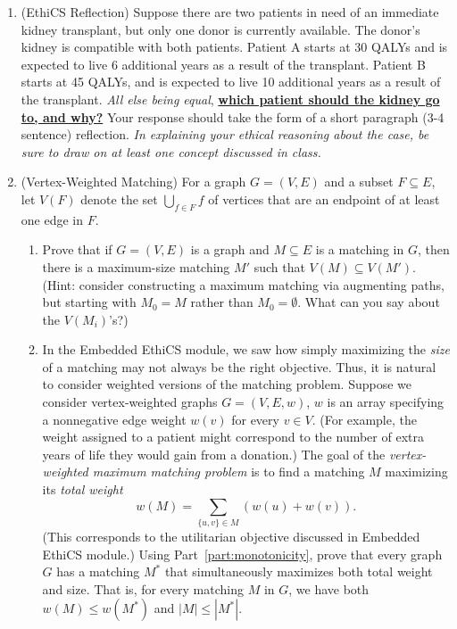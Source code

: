 \documentclass[11pt]{article}
\begin{document}
\begin{enumerate}
\begin{enumerate}
    \end{enumerate}

 \item (EthiCS Reflection)
Suppose there are two patients in need of an immediate kidney transplant, but only one donor is currently available. The donor’s kidney is compatible with both patients. Patient A starts at 30 QALYs and is expected to live 6 additional years as a result of the transplant. Patient B starts at 45 QALYs, and is expected to live 10 additional years as a result of the transplant. {\em All else being equal}, \underline{\textbf{which patient should the kidney go to, and why?}} Your response should take the form of a short paragraph (3-4 sentence) reflection. {\em In explaining your ethical reasoning about the case, be sure to draw on at least one concept discussed in class.}
 
 \item (Vertex-Weighted Matching)
        For a graph $G=(V,E)$ and a subset $F\subseteq E$, 
        let $V(F)$ denote the set $\bigcup_{f \in F}f$ of 
        vertices that are an endpoint of at least one edge in $F$.
        \begin{enumerate}
        \item Prove that if $G=(V,E)$ is a graph and $M\subseteq E$ is a matching in $G$, then there is a maximum-size matching $M'$ such that $V(M)\subseteq V(M')$.  (Hint: consider constructing a maximum matching via augmenting paths, but starting with $M_0=M$ rather than $M_0=\emptyset$. What can you say about the $V(M_i)$'s?) \label{part:monotonicity}

        \item   In the Embedded EthiCS module, we saw how simply maximizing the {\em size} of a matching may not always be the right objective.  Thus, it is natural to consider weighted versions of the matching problem. Suppose 
        we consider vertex-weighted graphs $G = (V,E,w)$, $w$ is an array specifying a nonnegative edge weight $w(v)$ for every $v\in V$.  (For example, the weight assigned to a patient might correspond to the number of extra years of life they would gain from a donation.)
          The goal of the {\em vertex-weighted maximum matching problem} is to find a matching $M$ maximizing its {\em total weight} $$w(M) = \sum_{\{u,v\}\in M} (w(u)+w(v)).$$
        (This corresponds to the utilitarian objective discussed in Embedded EthiCS module.)
        Using Part~\ref{part:monotonicity}, prove that every graph $G$ has a matching $M^*$ that simultaneously maximizes both total weight and size.  That is, for every matching $M$ in $G$, we have
        both $w(M)\leq w(M^*)$ and $|M|\leq |M^*|$.


\end{enumerate}
\end{enumerate}
\end{document}
